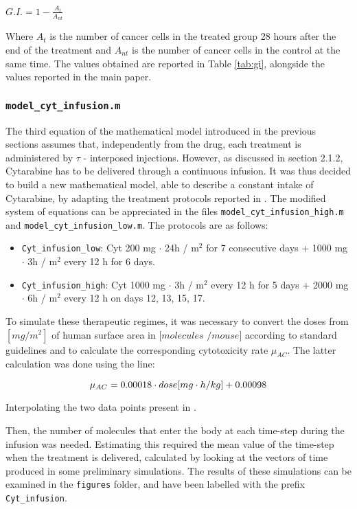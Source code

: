 $G.I. = 1 - \frac{A_t}{A_{nt}}$ 

Where $A_t$ is the number of cancer cells in the treated group 28 hours after the end of the treatment and $A_{nt}$ is the number of cancer cells in the control at the same time. The values obtained are reported in Table \ref{tab:gi}, alongside the values reported in the main paper.

\subsubsection{\texttt{model\_cyt\_infusion.m}}
The third equation of the mathematical model introduced in the previous sections assumes that, independently from the drug, each treatment is administered by $\tau$ - interposed injections. However, as discussed in section 2.1.2, Cytarabine has to be delivered through a continuous infusion. 
It was thus decided to build a new mathematical model, able to describe a constant intake of Cytarabine, by adapting the treatment protocols reported in \cite{cyt-3}. The modified system of equations can be appreciated in the files \texttt{model\_cyt\_infusion\_high.m} and \texttt{model\_cyt\_infusion\_low.m}. The protocols are as follows:

\begin{itemize}
	\item \texttt{Cyt\_infusion\_low}: Cyt 200 mg $\cdot$ 24h / m$^2$ for 7 consecutive days + 1000 mg $\cdot$ 3h / m$^2$ every 12 h for 6 days.
	\item \texttt{Cyt\_infusion\_high}: Cyt 1000 mg $\cdot$ 3h / m$^2$ every 12 h for 5 days + 2000 mg $\cdot$ 6h / m$^2$ every 12 h on days 12, 13, 15, 17.
\end{itemize}

To simulate these therapeutic regimes, it was necessary to convert the doses from $[mg / m^2]$ of human surface area in $[molecules$ $/mouse]$ according to standard guidelines \cite{dose-conversion} and to calculate the corresponding cytotoxicity rate $\mu_{AC}$. The latter calculation was done using the line: 

$$ \mu_{AC} = 0.00018 \cdot \small{dose} [mg \cdot h/kg]+ 0.00098 $$

Interpolating the two data points present in \cite{main-paper}. 

Then, the number of molecules that enter the body at each time-step during the infusion was needed. Estimating this required the mean value of the time-step when the treatment is delivered, calculated by looking at the vectors of time produced in some preliminary simulations. The results of these simulations can be examined in the \texttt{figures} folder, and have been labelled with the prefix \texttt{Cyt\_infusion}. 
